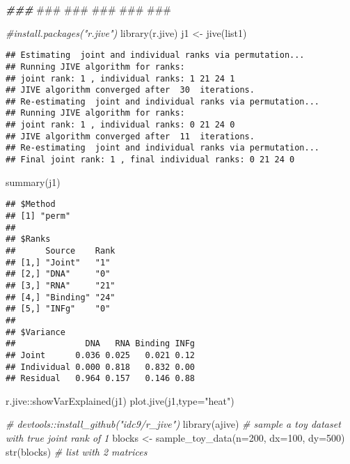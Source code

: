 \documentclass[
]{article}
\newenvironment{Shaded}{\begin{snugshade}}{\end{snugshade}}
\newcommand{\AlertTok}[1]{\textcolor[rgb]{0.94,0.16,0.16}{#1}}
\newcommand{\AttributeTok}[1]{\textcolor[rgb]{0.77,0.63,0.00}{#1}}
\newcommand{\CommentTok}[1]{\textcolor[rgb]{0.56,0.35,0.01}{\textit{#1}}}
\newcommand{\DecValTok}[1]{\textcolor[rgb]{0.00,0.00,0.81}{#1}}
\newcommand{\DocumentationTok}[1]{\textcolor[rgb]{0.56,0.35,0.01}{\textbf{\textit{#1}}}}
\newcommand{\FunctionTok}[1]{\textcolor[rgb]{0.00,0.00,0.00}{#1}}
\newcommand{\NormalTok}[1]{#1}
\newcommand{\OtherTok}[1]{\textcolor[rgb]{0.56,0.35,0.01}{#1}}
\newcommand{\SpecialCharTok}[1]{\textcolor[rgb]{0.00,0.00,0.00}{#1}}
\newcommand{\StringTok}[1]{\textcolor[rgb]{0.31,0.60,0.02}{#1}}
\begin{document}
\begin{Shaded}
\begin{Highlighting}[]
\DocumentationTok{\#\#\# }\AlertTok{\#\#\#}\DocumentationTok{ }\AlertTok{\#\#\#}\DocumentationTok{ }\AlertTok{\#\#\#}\DocumentationTok{ }\AlertTok{\#\#\#}\DocumentationTok{ }\AlertTok{\#\#\#}\DocumentationTok{ }

\CommentTok{\#install.packages("r.jive")}
\FunctionTok{library}\NormalTok{(r.jive)}
\NormalTok{j1 }\OtherTok{\textless{}{-}} \FunctionTok{jive}\NormalTok{(list1)}
\end{Highlighting}
\end{Shaded}

\begin{verbatim}
## Estimating  joint and individual ranks via permutation...
## Running JIVE algorithm for ranks:
## joint rank: 1 , individual ranks: 1 21 24 1 
## JIVE algorithm converged after  30  iterations.
## Re-estimating  joint and individual ranks via permutation...
## Running JIVE algorithm for ranks:
## joint rank: 1 , individual ranks: 0 21 24 0 
## JIVE algorithm converged after  11  iterations.
## Re-estimating  joint and individual ranks via permutation...
## Final joint rank: 1 , final individual ranks: 0 21 24 0
\end{verbatim}

\begin{Shaded}
\begin{Highlighting}[]
\FunctionTok{summary}\NormalTok{(j1)}
\end{Highlighting}
\end{Shaded}

\begin{verbatim}
## $Method
## [1] "perm"
## 
## $Ranks
##      Source    Rank
## [1,] "Joint"   "1" 
## [2,] "DNA"     "0" 
## [3,] "RNA"     "21"
## [4,] "Binding" "24"
## [5,] "INFg"    "0" 
## 
## $Variance
##              DNA   RNA Binding INFg
## Joint      0.036 0.025   0.021 0.12
## Individual 0.000 0.818   0.832 0.00
## Residual   0.964 0.157   0.146 0.88
\end{verbatim}

\begin{Shaded}
\begin{Highlighting}[]
\NormalTok{r.jive}\SpecialCharTok{::}\FunctionTok{showVarExplained}\NormalTok{(j1)}
\FunctionTok{plot.jive}\NormalTok{(j1,}\AttributeTok{type=}\StringTok{"heat"}\NormalTok{)}

\CommentTok{\# devtools::install\_github("idc9/r\_jive")}
\FunctionTok{library}\NormalTok{(ajive)}
\CommentTok{\# sample a toy dataset with true joint rank of 1}
\NormalTok{blocks }\OtherTok{\textless{}{-}} \FunctionTok{sample\_toy\_data}\NormalTok{(}\AttributeTok{n=}\DecValTok{200}\NormalTok{, }\AttributeTok{dx=}\DecValTok{100}\NormalTok{, }\AttributeTok{dy=}\DecValTok{500}\NormalTok{)}
\FunctionTok{str}\NormalTok{(blocks) }\CommentTok{\# list with 2 matrices }
\end{Highlighting}
\end{Shaded}
\end{document}
